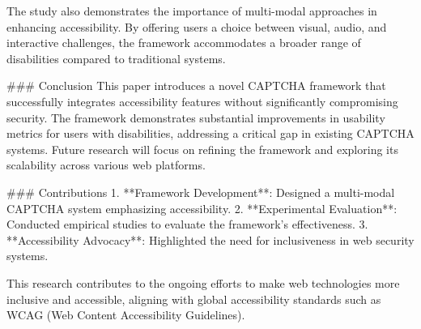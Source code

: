 The study also demonstrates the importance of multi-modal approaches in enhancing accessibility. By offering users a choice between visual, audio, and interactive challenges, the framework accommodates a broader range of disabilities compared to traditional systems.

### Conclusion  
This paper introduces a novel CAPTCHA framework that successfully integrates accessibility features without significantly compromising security. The framework demonstrates substantial improvements in usability metrics for users with disabilities, addressing a critical gap in existing CAPTCHA systems. Future research will focus on refining the framework and exploring its scalability across various web platforms.

### Contributions  
1. **Framework Development**: Designed a multi-modal CAPTCHA system emphasizing accessibility.  
2. **Experimental Evaluation**: Conducted empirical studies to evaluate the framework's effectiveness.  
3. **Accessibility Advocacy**: Highlighted the need for inclusiveness in web security systems.  

This research contributes to the ongoing efforts to make web technologies more inclusive and accessible, aligning with global accessibility standards such as WCAG (Web Content Accessibility Guidelines).
